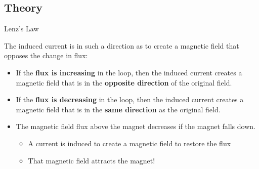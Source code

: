 \documentclass[aspectratio=169,
hyperref={colorlinks,urlcolor=blue}
]{beamer}
\begin{document}
\subsection{Theory}
\label{subsec:leztheory}
\begin{bulletframe}{Lenz's Law}
\item The induced current is in such a direction as to create a magnetic field that opposes the change in flux:
\begin{itemize}
\item If the \textbf{flux is increasing} in the loop, then the induced current creates a magnetic field that is in the \textbf{opposite direction} of the original field.
\item If the \textbf{flux is decreasing} in the loop, then the induced current creates a magnetic field that is in the \textbf{same direction} as the original field.
\end{itemize}

\end{bulletframe}


{
\begin{itemize}
\item The magnetic field flux above the magnet decreases if the magnet falls down.
\begin{itemize}
\item A current is induced to create a magnetic field to restore the flux
\item That magnetic field attracts the magnet!
\end{itemize}
\end{itemize}
}
{
}




\end{document}
